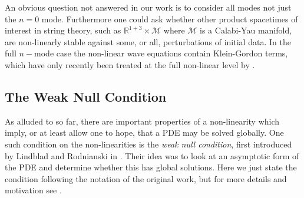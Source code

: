 \documentclass[11pt, a4paper]{amsart}
\numberwithin{equation}{section}
\numberwithin{theorem}{section}
\newcommand{\R}{\mathbb{R}}
\begin{document}
An obvious question not answered in our work is to consider all modes not just the $n=0$ mode.  Furthermore one could ask whether other product spacetimes of interest in string theory, such as $\R^{1+3} \times \mathcal{M}$ where $\mathcal{M}$ is a Calabi-Yau manifold, are non-linearly stable against some, or all, perturbations of initial data. In the full $n-$mode case the non-linear wave equations contain Klein-Gordon terms, which have only recently been treated at the full non-linear level by \cite{LeFloch:2015ppi}. 


\subsection{The Weak Null Condition} \label{section:intro-weak-null}
As alluded to so far, there are important properties of a non-linearity which imply, or at least allow one to hope, that a PDE may be solved globally. One such condition on the non-linearities is the \textit{weak null condition}, first introduced by Lindblad and Rodnianski in \cite{lindblad:weaknull}. Their idea was to look at an asymptotic form of the PDE and determine whether this has global solutions. Here we just state the condition following the notation of the original work, but for more details and motivation see \cite{lindblad:weaknull, LR:04}. 
\end{document}
